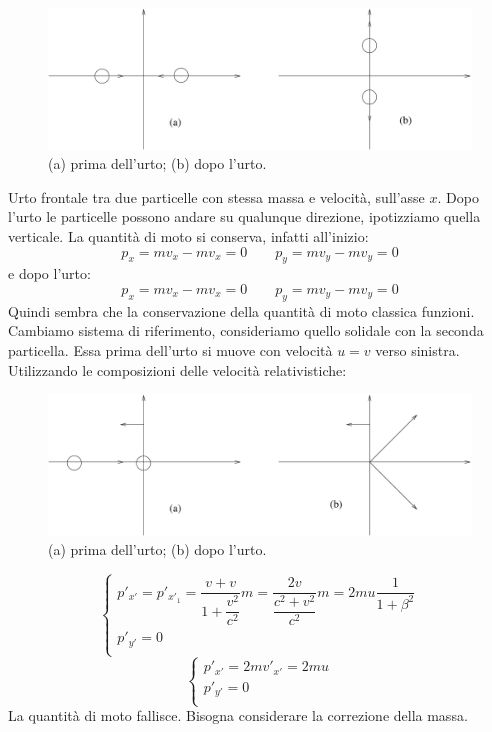 \begin{Es}
   \begin{figure}[htbp]
      \centering
      \includegraphics[scale=0.5]{immagini/fisica1/Q_rel1}
      \caption{(a) prima dell'urto; (b) dopo l'urto.}
   \end{figure}
   Urto frontale tra due particelle con stessa massa e velocità, sull'asse $x$. Dopo l'urto le particelle possono andare su qualunque direzione, ipotizziamo quella verticale. La quantità di moto si conserva, infatti all'inizio:
   \[p_x=mv_x-mv_x=0\qquad p_y=mv_y-mv_y=0\]
   e dopo l'urto:
   \[p_x=mv_x-mv_x=0\qquad p_y=mv_y-mv_y=0\]
   Quindi sembra che la conservazione della quantità di moto classica funzioni. Cambiamo sistema di riferimento, consideriamo quello solidale con la seconda particella. Essa prima dell'urto si muove con velocità $u=v$ verso sinistra. Utilizzando le composizioni delle velocità relativistiche:
   \begin{figure}[htbp]
      \centering
      \includegraphics[scale=0.5]{immagini/fisica1/Q_rel2}
      \caption{(a) prima dell'urto; (b) dopo l'urto.}
   \end{figure}

   \[\left\{
      \begin{array}{l}
         p'_{x'}=p'_{x'_1}=\dfrac{v+v}{1+\dfrac{v^2}{c^2}}m=\dfrac{2v}{\dfrac{c^2+v^2}{c^2}}m=2mu\dfrac{1}{1+\beta^2} \\
         p'_{y'}=0                                                                                                    \\
      \end{array}
      \right. \]
   \[\left\{
      \begin{array}{l}
         p'_{x'}=2mv'_{x'}=2mu \\
         p'_{y'}=0             \\
      \end{array}
      \right. \]
   La quantità di moto fallisce. Bisogna considerare la correzione della massa.
\end{Es}
